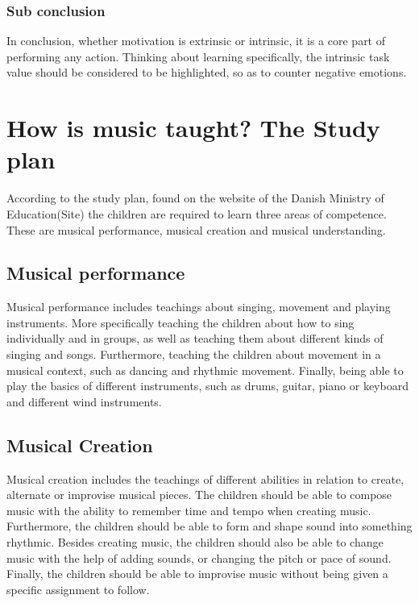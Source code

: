 \subsubsection*{Sub conclusion}
In conclusion, whether motivation is extrinsic or intrinsic, it is a core part of performing any action. Thinking about learning specifically, the intrinsic task value should be considered to be highlighted, so as to counter negative emotions.

\section{How is music taught? The Study plan}\label{studyPlan}
According to the study plan, found on the website of the Danish Ministry of Education(Site) the children are required to learn three areas of competence. These are musical performance, musical creation and musical understanding.

\subsection*{Musical performance}
Musical performance includes teachings about singing, movement and playing instruments. More specifically teaching the children about how to sing individually and in groups, as well as teaching them about different kinds of singing and songs. Furthermore, teaching the children about movement in a musical context, such as dancing and rhythmic movement. Finally, being able to play the basics of different instruments, such as drums, guitar, piano or keyboard and different wind instruments.

\subsection*{Musical Creation}
Musical creation includes the teachings of different abilities in relation to create, alternate or improvise musical pieces. The children should be able to compose music with the ability to remember time and tempo when creating music. Furthermore, the children should be able to form and shape sound into something rhythmic. Besides creating music, the children should also be able to change music with the help of adding sounds, or changing the pitch or pace of sound. Finally, the children should be able to improvise music without being given a specific assignment to follow.

